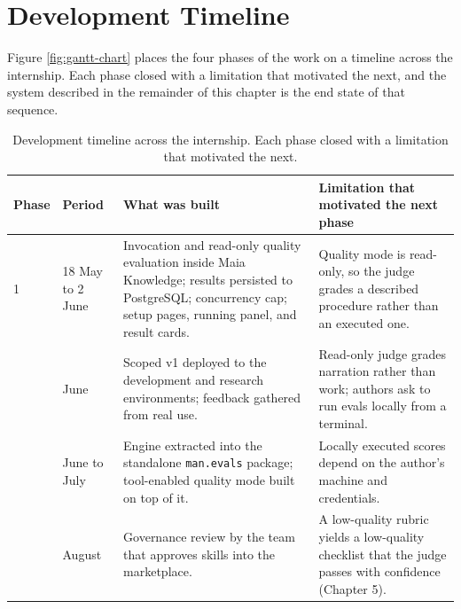 \section{Development Timeline}
Figure \ref{fig:gantt-chart} places the four phases of the work on a timeline across the internship. Each phase closed with a limitation that motivated the next, and the system described in the remainder of this chapter is the end state of that sequence.


\begin{table}[htbp]
\centering
\small
\begin{tabular}{@{}p{}p{}p{}p{}@{}}
\toprule
\textbf{Phase} & \textbf{Period} & \textbf{What was built} & \textbf{Limitation that motivated the next phase} \\
\midrule
1 & 18 May to 2 June & Invocation and read-only quality evaluation inside Maia Knowledge; results persisted to PostgreSQL; concurrency cap; setup pages, running panel, and result cards. & Quality mode is read-only, so the judge grades a described procedure rather than an executed one. \\
\addlinespace
2 & June & Scoped v1 deployed to the development and research environments; feedback gathered from real use. & Read-only judge grades narration rather than work; authors ask to run evals locally from a terminal. \\
\addlinespace
3 & June to July & Engine extracted into the standalone \texttt{man.evals} package; tool-enabled quality mode built on top of it. & Locally executed scores depend on the author's machine and credentials. \\
\addlinespace
4 & August & Governance review by the team that approves skills into the marketplace. & A low-quality rubric yields a low-quality checklist that the judge passes with confidence (Chapter 5). \\
\bottomrule
\end{tabular}
\caption{Development timeline across the internship. Each phase closed with a limitation that motivated the next.}
\label{tab:timeline}
\end{table}

